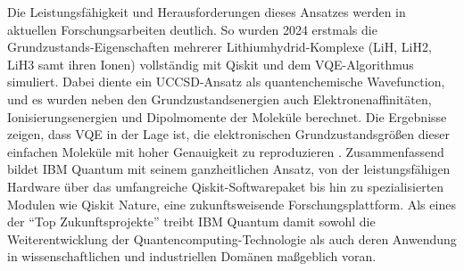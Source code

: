 Die Leistungsfähigkeit und Herausforderungen dieses Ansatzes werden in aktuellen Forschungsarbeiten deutlich. So wurden 2024 erstmals die Grundzustands-Eigenschaften mehrerer Lithiumhydrid-Komplexe (LiH, LiH2, LiH3 samt ihren Ionen) vollständig mit Qiskit und dem VQE-Algorithmus simuliert. Dabei diente ein UCCSD-Ansatz als quantenchemische Wavefunction, und es wurden neben den Grundzustandsenergien auch Elektronenaffinitäten, Ionisierungsenergien und Dipolmomente der Moleküle berechnet. Die Ergebnisse zeigen, dass VQE in der Lage ist, die elektronischen Grundzustandsgrößen dieser einfachen Moleküle mit hoher Genauigkeit zu reproduzieren \citealp[4]{avramidisGroundStateProperty2024}.
Zusammenfassend bildet IBM Quantum mit seinem ganzheitlichen Ansatz, von der leistungsfähigen Hardware über das umfangreiche Qiskit-Softwarepaket bis hin zu spezialisierten Modulen wie Qiskit Nature, eine zukunftsweisende Forschungsplattform. Als eines der “Top Zukunftsprojekte” treibt IBM Quantum damit sowohl die Weiterentwicklung der Quantencomputing-Technologie als auch deren Anwendung in wissenschaftlichen und industriellen Domänen maßgeblich voran.

